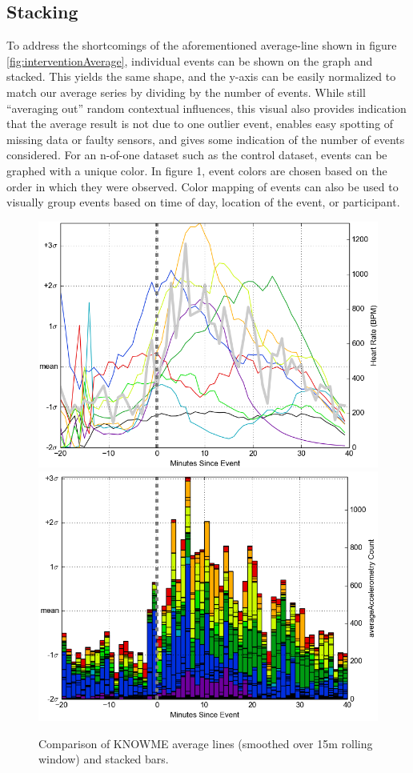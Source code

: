 \subsection{Stacking}
To address the shortcomings of the aforementioned average-line shown in figure \ref{fig:interventionAverage}, individual events can be shown on the graph and stacked.
This yields the same shape, and the y-axis can be easily normalized to match our average series by dividing by the number of events.
While still “averaging out” random contextual influences, this visual also provides indication that the average result is not due to one outlier event, enables easy spotting of missing data or faulty sensors, and gives some indication of the number of events considered.
For an n-of-one dataset such as the control dataset, events can be graphed with a unique color.
In figure 1, event colors are chosen based on the order in which they were observed.
Color mapping of events can also be used to visually group events based on time of day, location of the event, or participant.

\begin{figure}
\centering
\includegraphics[width=0.9\columnwidth]{./img/knowMe_60m_lines_smoothed15m.png}
\includegraphics[width=0.9\columnwidth]{./img/knowMe_60m_bars.png}
\caption{Comparison of KNOWME average lines (smoothed over 15m rolling window) and stacked bars.}
\label{fig:knowMeCompare}
\end{figure}

